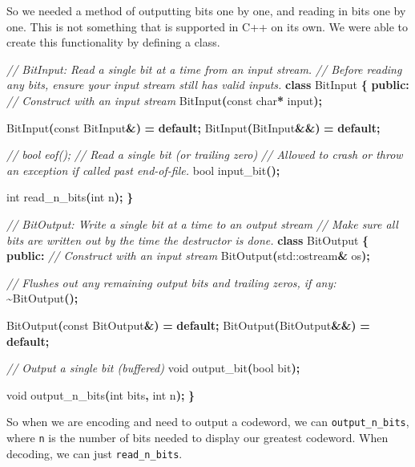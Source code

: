 \documentclass[12pt,twoside]{reedthesis}
\newenvironment{Shaded}{\begin{snugshade}}{\end{snugshade}}
\newcommand{\AttributeTok}[1]{\textcolor[rgb]{0.77,0.63,0.00}{#1}}
\newcommand{\BuiltInTok}[1]{#1}
\newcommand{\CommentTok}[1]{\textcolor[rgb]{0.56,0.35,0.01}{\textit{#1}}}
\newcommand{\ControlFlowTok}[1]{\textcolor[rgb]{0.13,0.29,0.53}{\textbf{#1}}}
\newcommand{\DataTypeTok}[1]{\textcolor[rgb]{0.13,0.29,0.53}{#1}}
\newcommand{\KeywordTok}[1]{\textcolor[rgb]{0.13,0.29,0.53}{\textbf{#1}}}
\newcommand{\NormalTok}[1]{#1}
\newcommand{\OperatorTok}[1]{\textcolor[rgb]{0.81,0.36,0.00}{\textbf{#1}}}
\begin{document}
So we needed a method of outputting bits one by one, and reading in bits one by one. This is not something that is supported in C++ on its own. We were able to create this functionality by defining a class.
\begin{Shaded}
\begin{Highlighting}[]
\CommentTok{// BitInput: Read a single bit at a time from an input stream.}
\CommentTok{// Before reading any bits, ensure your input stream still has valid inputs.}
\KeywordTok{class}\NormalTok{ BitInput }\OperatorTok{\{}
 \KeywordTok{public}\OperatorTok{:}
  \CommentTok{// Construct with an input stream}
\NormalTok{  BitInput}\OperatorTok{(}\AttributeTok{const} \DataTypeTok{char}\OperatorTok{*}\NormalTok{ input}\OperatorTok{);}

\NormalTok{  BitInput}\OperatorTok{(}\AttributeTok{const}\NormalTok{ BitInput}\OperatorTok{\&)} \OperatorTok{=} \ControlFlowTok{default}\OperatorTok{;}
\NormalTok{  BitInput}\OperatorTok{(}\NormalTok{BitInput}\OperatorTok{\&\&)} \OperatorTok{=} \ControlFlowTok{default}\OperatorTok{;}

  \CommentTok{// bool eof();}
  \CommentTok{// Read a single bit (or trailing zero)}
  \CommentTok{// Allowed to crash or throw an exception if called past end{-}of{-}file.}
  \DataTypeTok{bool}\NormalTok{ input\_bit}\OperatorTok{();}

  \DataTypeTok{int}\NormalTok{ read\_n\_bits}\OperatorTok{(}\DataTypeTok{int}\NormalTok{ n}\OperatorTok{);}
\OperatorTok{\}}

\CommentTok{// BitOutput: Write a single bit at a time to an output stream}
\CommentTok{// Make sure all bits are written out by the time the destructor is done.}
\KeywordTok{class}\NormalTok{ BitOutput }\OperatorTok{\{}
 \KeywordTok{public}\OperatorTok{:}
  \CommentTok{// Construct with an input stream}
\NormalTok{  BitOutput}\OperatorTok{(}\BuiltInTok{std::}\NormalTok{ostream}\OperatorTok{\&}\NormalTok{ os}\OperatorTok{);}

  \CommentTok{// Flushes out any remaining output bits and trailing zeros, if any:}
  \OperatorTok{\textasciitilde{}}\NormalTok{BitOutput}\OperatorTok{();}

\NormalTok{  BitOutput}\OperatorTok{(}\AttributeTok{const}\NormalTok{ BitOutput}\OperatorTok{\&)} \OperatorTok{=} \ControlFlowTok{default}\OperatorTok{;}
\NormalTok{  BitOutput}\OperatorTok{(}\NormalTok{BitOutput}\OperatorTok{\&\&)} \OperatorTok{=} \ControlFlowTok{default}\OperatorTok{;}

  \CommentTok{// Output a single bit (buffered)}
  \DataTypeTok{void}\NormalTok{ output\_bit}\OperatorTok{(}\DataTypeTok{bool}\NormalTok{ bit}\OperatorTok{);}

  \DataTypeTok{void}\NormalTok{ output\_n\_bits}\OperatorTok{(}\DataTypeTok{int}\NormalTok{ bits}\OperatorTok{,} \DataTypeTok{int}\NormalTok{ n}\OperatorTok{);}
\OperatorTok{\}}
\end{Highlighting}
\end{Shaded}
So when we are encoding and need to output a codeword, we can \texttt{output\_n\_bits}, where \texttt{n} is the number of bits needed to display our greatest codeword. When decoding, we can just \texttt{read\_n\_bits}.
\end{document}

